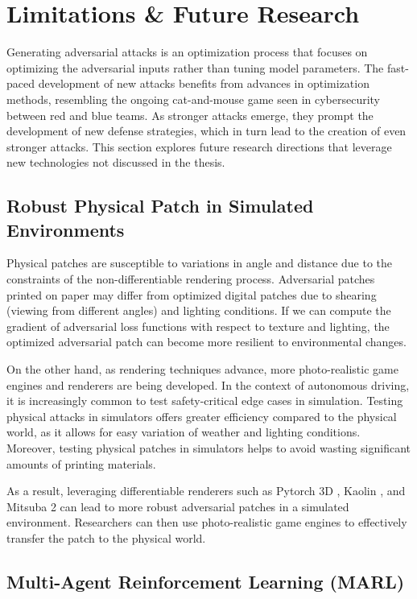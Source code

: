 \section{Limitations \& Future Research}

Generating adversarial attacks is an optimization process that focuses on optimizing the adversarial inputs rather than tuning model parameters. The fast-paced development of new attacks benefits from advances in optimization methods, resembling the ongoing cat-and-mouse game seen in cybersecurity between red and blue teams. As stronger attacks emerge, they prompt the development of new defense strategies, which in turn lead to the creation of even stronger attacks. This section explores future research directions that leverage new technologies not discussed in the thesis.

\subsection{Robust Physical Patch in Simulated Environments}

Physical patches are susceptible to variations in angle and distance due to the constraints of the non-differentiable rendering process. Adversarial patches printed on paper may differ from optimized digital patches due to shearing (viewing from different angles) and lighting conditions. If we can compute the gradient of adversarial loss functions with respect to texture and lighting, the optimized adversarial patch can become more resilient to environmental changes. 

On the other hand, as rendering techniques advance, more photo-realistic game engines and renderers are being developed. In the context of autonomous driving, it is increasingly common to test safety-critical edge cases in simulation. Testing physical attacks in simulators offers greater efficiency compared to the physical world, as it allows for easy variation of weather and lighting conditions. Moreover, testing physical patches in simulators helps to avoid wasting significant amounts of printing materials.

As a result, leveraging differentiable renderers such as Pytorch 3D \citep{ravi2020pytorch3d}, Kaolin \citep{KaolinLibrary}, and Mitsuba 2 \citep{nimier2019mitsuba} can lead to more robust adversarial patches in a simulated environment. Researchers can then use photo-realistic game engines to effectively transfer the patch to the physical world.

\subsection{Multi-Agent Reinforcement Learning (MARL)}

